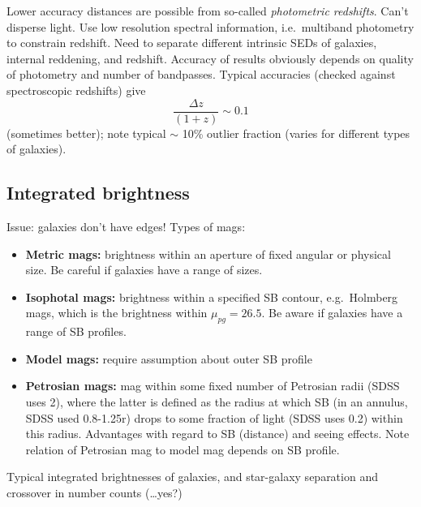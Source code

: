 \documentclass{article}
\newcommand{\mynotes}[1]{\textcolor{cadmiumorange}{#1}}
\begin{document}
Lower accuracy distances are possible from so-called \textit{photometric
redshifts}. \mynotes{Can't disperse light.} Use low resolution spectral
information, i.e.\ multiband photometry to constrain redshift. Need to
separate different intrinsic SEDs of galaxies, internal reddening, and
redshift. Accuracy of results obviously depends on quality of photometry
and number of bandpasses. Typical accuracies (checked against spectroscopic
redshifts) give
\[
    \frac{\Delta{z}}{\left(1+z\right)} \sim 0.1
\]
(sometimes better); note typical $\sim$ 10\% outlier fraction
(varies for different types of galaxies).



\subsection{Integrated brightness}
Issue: galaxies don't have edges! Types of mags:
\begin{itemize}
    \item \textbf{Metric mags:} brightness within an aperture of fixed
        angular or physical size. Be careful if galaxies have a range
        of sizes.
    \item \textbf{Isophotal mags:} brightness within a specified SB
        contour, e.g.\ Holmberg mags, which is the brightness within
        $\mu_{pg} = 26.5$. Be aware if galaxies have a range of SB profiles.
    \item \textbf{Model mags:} require assumption about outer SB profile
    \item \textbf{Petrosian mags:} mag within some fixed number of Petrosian
        radii (SDSS uses 2), where the latter is defined as the radius at
        which SB (in an annulus, SDSS used 0.8-1.25r) drops to some fraction
        of light (SDSS uses 0.2) within this radius. Advantages with regard
        to SB (distance) and seeing effects. Note relation of Petrosian mag
        to model mag depends on SB profile.
\end{itemize}
Typical integrated brightnesses of galaxies, and star-galaxy separation
and crossover in number counts \mynotes{(\ldots yes?)}
\end{document}
